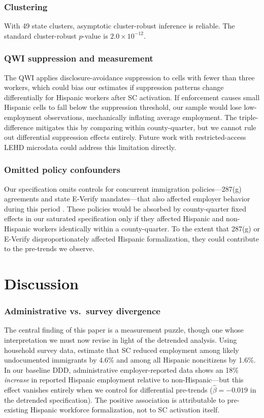 \documentclass[12pt]{article}
\begin{document}
\subsubsection*{Clustering} With 49 state clusters, asymptotic cluster-robust inference is reliable. The standard cluster-robust $p$-value is $2.0 \times 10^{-12}$.

\subsubsection*{QWI suppression and measurement} The QWI applies disclosure-avoidance suppression to cells with fewer than three workers, which could bias our estimates if suppression patterns change differentially for Hispanic workers after SC activation. If enforcement causes small Hispanic cells to fall below the suppression threshold, our sample would lose low-employment observations, mechanically inflating average employment. The triple-difference mitigates this by comparing within county-quarter, but we cannot rule out differential suppression effects entirely. Future work with restricted-access LEHD microdata could address this limitation directly.

\subsubsection*{Omitted policy confounders} Our specification omits controls for concurrent immigration policies---287(g) agreements and state E-Verify mandates---that also affected employer behavior during this period \citep{orrenius2015behind,bohn2015did}. These policies would be absorbed by county-quarter fixed effects in our saturated specification only if they affected Hispanic and non-Hispanic workers identically within a county-quarter. To the extent that 287(g) or E-Verify disproportionately affected Hispanic formalization, they could contribute to the pre-trends we observe.


\section{Discussion}
\label{sec:discussion}

\subsubsection*{Administrative vs.\ survey divergence} The central finding of this paper is a measurement puzzle, though one whose interpretation we must now revise in light of the detrended analysis. Using household survey data, \citet{east2023labor} estimate that SC reduced employment among likely undocumented immigrants by 4.6\% and among all Hispanic noncitizens by 1.6\%. In our baseline DDD, administrative employer-reported data shows an 18\% \textit{increase} in reported Hispanic employment relative to non-Hispanic---but this effect vanishes entirely when we control for differential pre-trends ($\hat{\beta} = -0.019$ in the detrended specification). The positive association is attributable to pre-existing Hispanic workforce formalization, not to SC activation itself.
\end{document}
